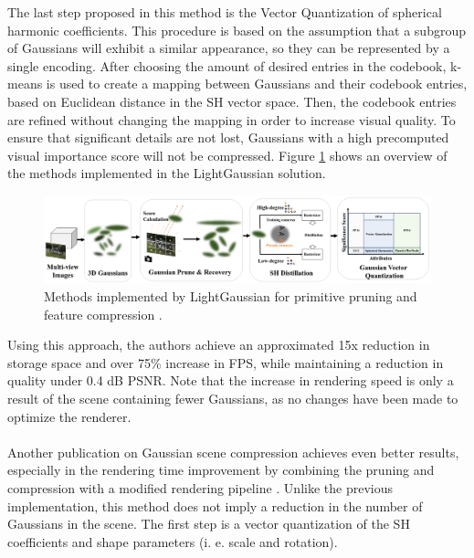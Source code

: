 The last step proposed in this method is the Vector Quantization of spherical harmonic coefficients. This procedure is based on the assumption that a subgroup of Gaussians will exhibit a similar appearance, so they can be represented by a single encoding. After choosing the amount of desired entries in the codebook, k-means is used to create a mapping between Gaussians and their codebook entries, based on Euclidean distance in the SH vector space. Then, the codebook entries are refined without changing the mapping in order to increase visual quality. To ensure that significant details are not lost, Gaussians with a high precomputed visual importance score will not be compressed. Figure \ref{fig:lgmethod} shows an overview of the methods implemented in the LightGaussian solution.

\begin{figure}[H]
    \centering
    \includegraphics[width=0.8\linewidth]{figures/lgmethod.png}
    \caption{Methods implemented by LightGaussian for primitive pruning and feature compression \cite{fan2023lightgaussian}.}
    \label{fig:lgmethod}
\end{figure}

Using this approach, the authors achieve an approximated 15x reduction in storage space and over 75\% increase in FPS, while maintaining a reduction in quality under 0.4 dB PSNR. Note that the increase in rendering speed is only a result of the scene containing fewer Gaussians, as no changes have been made to optimize the renderer. 

\paragraph{}
Another publication on Gaussian scene compression achieves even better results, especially in the rendering time improvement by combining the pruning and compression with a modified rendering pipeline \cite{Niedermayr_2024_CVPR}. Unlike the previous implementation, this method does not imply a reduction in the number of Gaussians in the scene. The first step is a vector quantization of the SH coefficients and shape parameters (i. e. scale and rotation). 

